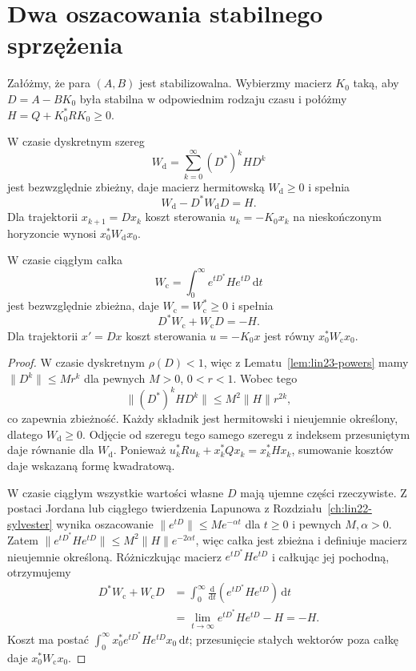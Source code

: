 \section{Dwa oszacowania stabilnego sprzężenia}
\label{sec:lin26-feedback-bound}

\begin{lemat}
\label{lem:lin26-feedback-bound}
Załóżmy, że para \((A,B)\)
jest stabilizowalna.
Wybierzmy macierz \(K_0\)
taką, aby \(D=A-BK_0\)
była stabilna w odpowiednim
rodzaju czasu i połóżmy
\(H=Q+K_0^*RK_0\ge0\).

W czasie dyskretnym szereg
\[
 W_{\mathrm d}
 =\sum_{k=0}^{\infty}(D^*)^kHD^k
\]
jest bezwzględnie zbieżny,
daje macierz hermitowską
\(W_{\mathrm d}\ge0\)
i spełnia
\[
 W_{\mathrm d}-D^*W_{\mathrm d}D=H.
\]
Dla trajektorii
\(x_{k+1}=Dx_k\)
koszt sterowania \(u_k=-K_0x_k\)
na nieskończonym horyzoncie
wynosi \(x_0^*W_{\mathrm d}x_0\).

W czasie ciągłym całka
\[
 W_{\mathrm c}
 =\int_0^\infty e^{tD^*}He^{tD}\,\mathrm dt
\]
jest bezwzględnie zbieżna,
daje \(W_{\mathrm c}=W_{\mathrm c}^*\ge0\)
i spełnia
\[
 D^*W_{\mathrm c}+W_{\mathrm c}D=-H.
\]
Dla trajektorii \(x'=Dx\)
koszt sterowania \(u=-K_0x\)
jest równy \(x_0^*W_{\mathrm c}x_0\).
\end{lemat}
\begin{proof}
W czasie dyskretnym
\(\rho(D)<1\), więc
z Lematu~\ref{lem:lin23-powers}
mamy \(\|D^k\|\le Mr^k\)
dla pewnych \(M>0\), \(0<r<1\).
Wobec tego
\[
 \|(D^*)^kHD^k\|
 \le M^2\|H\|r^{2k},
\]
co zapewnia zbieżność.
Każdy składnik jest
hermitowski i nieujemnie
określony, dlatego
\(W_{\mathrm d}\ge0\).
Odjęcie od szeregu
tego samego szeregu
z indeksem przesuniętym
daje równanie dla \(W_{\mathrm d}\).
Ponieważ
\(u_k^*Ru_k+x_k^*Qx_k=x_k^*Hx_k\),
sumowanie kosztów
daje wskazaną formę kwadratową.

W czasie ciągłym
wszystkie wartości własne \(D\)
mają ujemne części rzeczywiste.
Z postaci Jordana lub
ciągłego twierdzenia Lapunowa
z Rozdziału~\ref{ch:lin22-sylvester}
wynika oszacowanie
\(\|e^{tD}\|\le Me^{-\alpha t}\)
dla \(t\ge0\)
i pewnych \(M,\alpha>0\).
Zatem
\(\|e^{tD^*}He^{tD}\|
 \le M^2\|H\|e^{-2\alpha t}\),
więc całka jest zbieżna
i definiuje macierz
nieujemnie określoną.
Różniczkując macierz
\(e^{tD^*}He^{tD}\)
i całkując jej pochodną,
otrzymujemy
\[
 \begin{aligned}
 D^*W_{\mathrm c}+W_{\mathrm c}D
 &=\int_0^\infty
     \frac{\mathrm d}{\mathrm dt}
       (e^{tD^*}He^{tD})\,\mathrm dt\\
 &=\lim_{t\to\infty}
       e^{tD^*}He^{tD}-H=-H.
 \end{aligned}
\]
Koszt ma postać
\(\int_0^\infty x_0^*e^{tD^*}
He^{tD}x_0\,\mathrm dt\);
przesunięcie stałych
wektorów poza całkę
daje \(x_0^*W_{\mathrm c}x_0\).
\end{proof}

